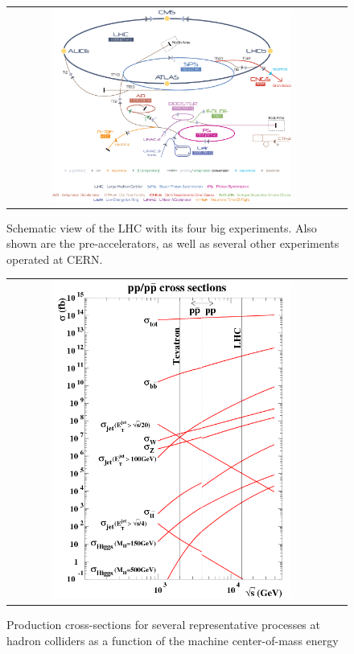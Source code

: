 \begin{figure}[tbh!]
	\centering
	\begin{tabular}{cc}
		\includegraphics[width=0.75\textwidth]{detector/pics/CERN_complex.jpg}
	\end{tabular}
	\caption{Schematic view of the LHC with its four big experiments. Also shown are the pre-accelerators, as well as several other experiments operated at CERN.}
	\label{fig:CERN_complex}
\end{figure}

\begin{figure}[tbh!]
	\centering
	\begin{tabular}{cc}
		\includegraphics[width=0.75\textwidth]{detector/pics/LHC_xsec.png}
	\end{tabular}
	\caption{Production cross-sections for several representative processes at hadron colliders as a function of the machine center-of-mass energy}
	\label{fig:LHC_xsec}
\end{figure}

